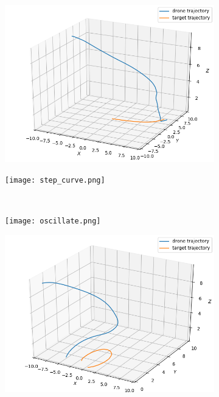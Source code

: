 \documentclass[conf]{new-aiaa}
\begin{document}
\begin{figure}
  \begin{subfigure}{0.5\textwidth}
    \includegraphics[width=\linewidth]{curve10.png}
    \caption{} \label{fig:curve10}
  \end{subfigure}%
  \hspace*{\fill}   %
  \begin{subfigure}{0.5\textwidth}
    \texttt{[image: step\_curve.png]}
    \caption{} \label{fig:step_curve}
  \end{subfigure}%
  \hspace*{\fill}   %
  \\
  \begin{subfigure}{0.5\textwidth}
    \texttt{[image: oscillate.png]}
    \caption{} \label{fig:oscillate}
  \end{subfigure}%
  \hspace*{\fill}   %
  \begin{subfigure}{0.5\textwidth}
    \includegraphics[width=\linewidth]{fail.png}

\end{subfigure}
\end{figure}
\end{document}
